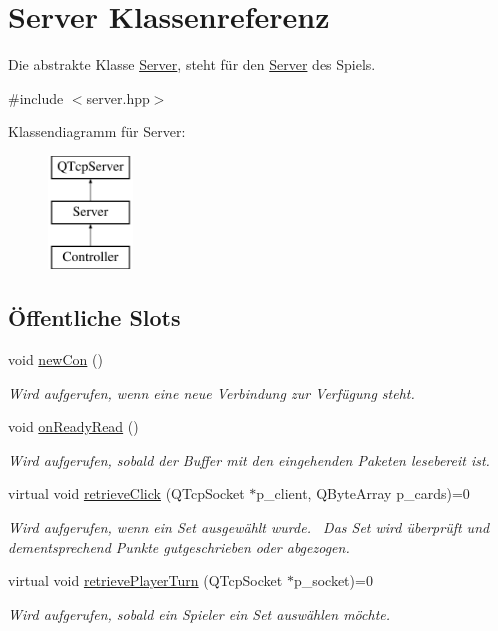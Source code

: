 \hypertarget{class_server}{}\section{Server Klassenreferenz}
\label{class_server}


Die abstrakte Klasse \hyperlink{class_server}{Server}, steht für den \hyperlink{class_server}{Server} des Spiels.  




{\ttfamily \#include $<$server.\+hpp$>$}

Klassendiagramm für Server\+:\begin{figure}[H]
\begin{center}
\leavevmode
\includegraphics[height=3.000000cm]{class_server}
\end{center}
\end{figure}
\subsection*{Öffentliche Slots}
\begin{DoxyCompactItemize}
\item 
void \hyperlink{class_server_a278a1ed6357a7d773c1d9d452f7d8cf1}{new\+Con} ()
\begin{DoxyCompactList}\small\item\em Wird aufgerufen, wenn eine neue Verbindung zur Verfügung steht. \end{DoxyCompactList}\item 
void \hyperlink{class_server_ac67d866fb14c4644acd1098bacfadeee}{on\+Ready\+Read} ()
\begin{DoxyCompactList}\small\item\em Wird aufgerufen, sobald der Buffer mit den eingehenden Paketen lesebereit ist. \end{DoxyCompactList}\item 
virtual void \hyperlink{class_server_aabd6ee61f3530f06cf7664a283f40f33}{retrieve\+Click} (Q\+Tcp\+Socket $\ast$p\+\_\+client, Q\+Byte\+Array p\+\_\+cards)=0
\begin{DoxyCompactList}\small\item\em Wird aufgerufen, wenn ein Set ausgewählt wurde.~\newline
 Das Set wird überprüft und dementsprechend Punkte gutgeschrieben oder abgezogen. \end{DoxyCompactList}\item 
virtual void \hyperlink{class_server_a5455bcd1eeb8acbf5d3b6d91420b44d4}{retrieve\+Player\+Turn} (Q\+Tcp\+Socket $\ast$p\+\_\+socket)=0
\begin{DoxyCompactList}\small\item\em Wird aufgerufen, sobald ein Spieler ein Set auswählen möchte. \end{DoxyCompactList}\end{DoxyCompactItemize}
